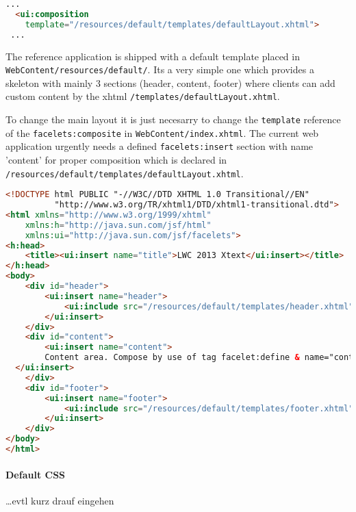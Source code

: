 \begin{lstlisting}[language=HTML]
 ...
  <ui:composition
    template="/resources/default/templates/defaultLayout.xhtml">
 ...
\end{lstlisting}

The reference application is shipped with a default template placed in
\newline \texttt{WebContent/resources/default/}. Its a very
simple one which provides a skeleton with mainly 3 sections (header, content,
footer) where clients can add custom content by the xhtml
\texttt{/templates/defaultLayout.xhtml}.

To change the main layout it is just necesarry to change the \texttt{template}
reference of the \texttt{facelets:composite} in \texttt{WebContent/index.xhtml}.
The current web application urgently needs a defined \texttt{facelets:insert}
section with name 'content' for proper composition which is declared in
\texttt{/resources/default/templates/defaultLayout.xhtml}.

\begin{lstlisting}[language=HTML]
<!DOCTYPE html PUBLIC "-//W3C//DTD XHTML 1.0 Transitional//EN" 
          "http://www.w3.org/TR/xhtml1/DTD/xhtml1-transitional.dtd">
<html xmlns="http://www.w3.org/1999/xhtml"
	xmlns:h="http://java.sun.com/jsf/html"
	xmlns:ui="http://java.sun.com/jsf/facelets">
<h:head>
	<title><ui:insert name="title">LWC 2013 Xtext</ui:insert></title>
</h:head>
<body>
	<div id="header">
		<ui:insert name="header">
			<ui:include src="/resources/default/templates/header.xhtml" />
		</ui:insert>
	</div>
	<div id="content">
		<ui:insert name="content">
    	Content area. Compose by use of tag facelet:define & name="content".
  </ui:insert>
	</div>
	<div id="footer">
		<ui:insert name="footer">
			<ui:include src="/resources/default/templates/footer.xhtml" />
		</ui:insert>
	</div>
</body>
</html>
\end{lstlisting}
\paragraph{Default CSS}
$\;$ \\
\ldots evtl kurz drauf eingehen
